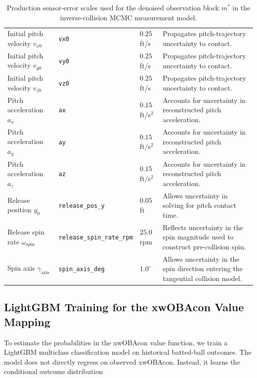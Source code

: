 \documentclass[11pt]{article}
\begin{document}
\begin{table}[H]
\begin{tabular}{llll}
Initial pitch velocity $v_{x0}$ &
\texttt{vx0} &
$0.25$ ft/s &
Propagates pitch-trajectory uncertainty to contact. \\

Initial pitch velocity $v_{y0}$ &
\texttt{vy0} &
$0.25$ ft/s &
Propagates pitch-trajectory uncertainty to contact. \\

Initial pitch velocity $v_{z0}$ &
\texttt{vz0} &
$0.25$ ft/s &
Propagates pitch-trajectory uncertainty to contact. \\

Pitch acceleration $a_x$ &
\texttt{ax} &
$0.15$ ft/s$^2$ &
Accounts for uncertainty in reconstructed pitch acceleration. \\

Pitch acceleration $a_y$ &
\texttt{ay} &
$0.15$ ft/s$^2$ &
Accounts for uncertainty in reconstructed pitch acceleration. \\

Pitch acceleration $a_z$ &
\texttt{az} &
$0.15$ ft/s$^2$ &
Accounts for uncertainty in reconstructed pitch acceleration. \\

Release position $y_0$ &
\texttt{release\_pos\_y} &
$0.05$ ft &
Allows uncertainty in solving for pitch contact time. \\

Release spin rate $\omega_{\mathrm{spin}}$ &
\texttt{release\_spin\_rate\_rpm} &
$25.0$ rpm &
Reflects uncertainty in the spin magnitude used to construct pre-collision spin. \\

Spin axis $\gamma_{\mathrm{axis}}$ &
\texttt{spin\_axis\_deg} &
$1.0^\circ$ &
Allows uncertainty in the spin direction entering the tangential collision model. \\

\bottomrule
\end{tabular}
\caption{\footnotesize Production sensor-error scales used for the denoised observation block $m^{\ast}$ in the inverse-collision MCMC measurement model.}
\label{tab:mobs_sensor_priors}
\end{table}


\subsection{LightGBM Training for the xwOBAcon Value Mapping}



To estimate the probabilities in the xwOBAcon value function, we train a LightGBM multiclass classification model on historical batted-ball outcomes. The model does not directly regress on observed xwOBAcon. Instead, it learns the conditional outcome distribution
\end{document}
